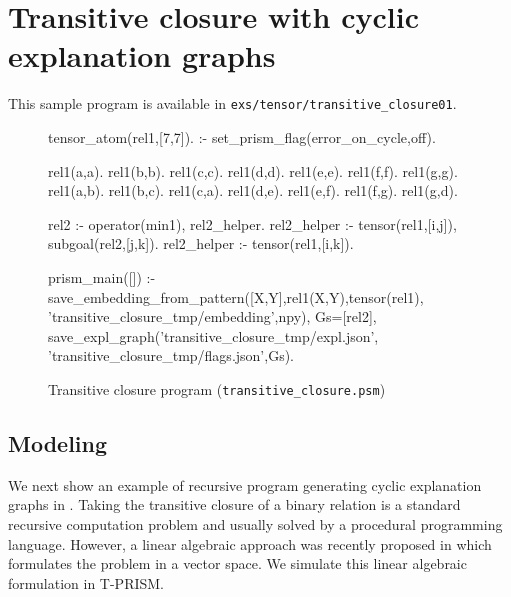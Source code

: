 \documentclass[a4paper]{report}
\begin{document}
\section{Transitive closure with cyclic explanation graphs}
\label{sec:transitive_closure01}

This sample program is available in {\tt exs/tensor/transitive\_closure01}.

\begin{figure}[tb]
\begin{prologcode}[numbers=left]
tensor_atom(rel1,[7,7]).
:- set_prism_flag(error_on_cycle,off).

rel1(a,a). rel1(b,b). rel1(c,c). rel1(d,d). rel1(e,e). rel1(f,f). rel1(g,g).
rel1(a,b). rel1(b,c). rel1(c,a).
rel1(d,e). rel1(e,f). rel1(f,g). rel1(g,d).

rel2 :- operator(min1), rel2_helper.
rel2_helper :- tensor(rel1,[i,j]), subgoal(rel2,[j,k]).
rel2_helper :- tensor(rel1,[i,k]).

prism_main([]) :-
    save_embedding_from_pattern([X,Y],rel1(X,Y),tensor(rel1),
                                'transitive_closure_tmp/embedding',npy),
    Gs=[rel2],
    save_expl_graph('transitive_closure_tmp/expl.json',
                    'transitive_closure_tmp/flags.json',Gs).
\end{prologcode}
\caption{Transitive closure program ({\tt transitive\_closure.psm})}
\label{fig:tc}
\end{figure}

\subsection*{Modeling}
We  next  show  an  example of  recursive  program  generating  cyclic
explanation  graphs  in  .   Taking  the  transitive
closure  of a  binary  relation is  a  standard recursive  computation
problem  and  usually solved  by  a  procedural programming  language.
However,   a   linear   algebraic  approach   was   recently   proposed
in  \cite{sato2017linear} which  formulates  the problem  in a  vector
space.  We simulate this linear algebraic formulation in T-PRISM.
\end{document}
